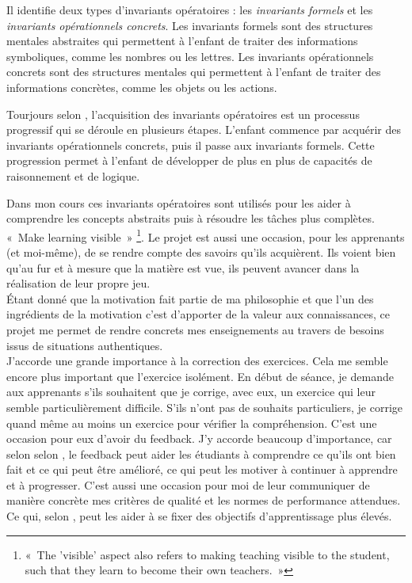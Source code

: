 Il identifie deux types d'invariants opératoires : les \emph{invariants formels} et les \emph{invariants opérationnels concrets}. Les invariants formels sont des structures mentales abstraites qui permettent à l'enfant de traiter des informations symboliques, comme les nombres ou les lettres. Les invariants opérationnels concrets sont des structures mentales qui permettent à l'enfant de traiter des informations concrètes, comme les objets ou les actions.

Tourjours selon \citet{piaget1970structures}, l'acquisition des invariants opératoires est un processus progressif qui se déroule en plusieurs étapes. L'enfant commence par acquérir des invariants opérationnels concrets, puis il passe aux invariants formels. Cette progression permet à l'enfant de développer de plus en plus de capacités de raisonnement et de logique.

Dans mon cours ces invariants opératoires sont utilisés pour les  aider à comprendre les concepts abstraits puis à résoudre les tâches plus complètes.\\

«~Make learning visible~» \footnote{«~The 'visible' aspect also refers to making teaching visible to the student, such that they learn to become their own teachers.~»\cite{hattie2012visible}}\cite{hattie2012visible}. Le projet est aussi une occasion, pour les apprenants (et moi-même), de se rendre compte des savoirs qu'ils acquièrent. Ils voient bien qu'au fur et à mesure que la matière est vue, ils peuvent avancer dans la réalisation de leur propre jeu.\\
Étant donné que la motivation fait partie de ma philosophie et que l’un des ingrédients de la motivation c’est d’apporter de la valeur aux connaissances\cite{viau1994motivation}, ce projet me permet de rendre concrets mes enseignements au travers de besoins issus de situations authentiques.\\

J'accorde une grande importance à la correction des exercices. Cela me semble encore plus important que l'exercice isolément. En début de séance, je demande aux apprenants s'ils souhaitent que je corrige, avec eux, un exercice qui leur semble particulièrement difficile. S’ils n’ont pas de souhaits particuliers, je corrige quand même au moins un exercice pour vérifier la compréhension. C'est une occasion pour eux d’avoir du feedback. J'y accorde beaucoup d'importance, car selon selon \citet{hattie2007power}, le feedback peut aider les étudiants à comprendre ce qu'ils ont bien fait et ce qui peut être amélioré, ce qui peut les motiver à continuer à apprendre et à progresser. C'est aussi une occasion pour moi de leur communiquer de manière concrète mes critères de qualité et les normes de performance attendues. Ce qui, selon \citet{sadler1989formative}, peut les aider à se fixer des objectifs d'apprentissage plus élevés. \\

